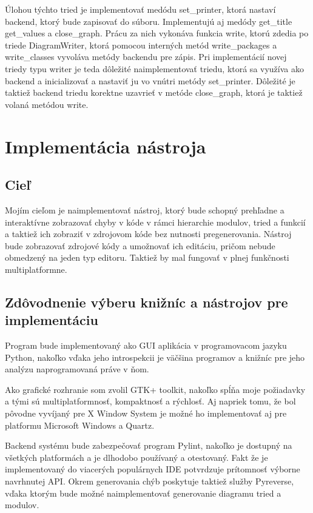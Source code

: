 \documentclass[11pt,oneside,final]{fithesis2}
\begin{document}
    	Úlohou týchto tried je implementovať medódu set\_printer, ktorá nastaví backend, ktorý bude zapisovať do súboru.
    	Implementujú aj medódy get\_title get\_values a close\_graph.
    	Prácu za nich vykonáva funkcia write, ktorú zdedia po triede DiagramWriter, ktorá pomocou interných metód write\_packages a write\_classes vyvoláva metódy backendu pre zápis. Pri implementácií novej triedy typu writer je teda dôležité naimplementovať triedu, ktorá sa využíva ako backend a inicializovať a nastaviť ju vo vnútri metódy set\_printer.
    	Dôležité je taktiež backend triedu korektne uzavrieť v metóde close\_graph, ktorá je taktiež volaná metódou write.
 
\chapter{Implementácia nástroja}
	\section{Cieľ}
	
	Mojím cieľom je naimplementovať nástroj, ktorý bude schopný prehľadne a interaktívne zobrazovať chyby v kóde v rámci hierarchie modulov, tried a funkcií a taktiež ich zobraziť v zdrojovom kóde bez nutnosti pregenerovania. Nástroj bude zobrazovať zdrojové kódy a umožnovať ich editáciu, pričom nebude obmedzený na jeden typ editoru. Taktiež by mal fungovať v plnej funkčnosti multiplatformne.
	
	\section{Zdôvodnenie výberu knižníc a nástrojov pre implementáciu}
		Program bude implementovaný ako GUI aplikácia v programovacom jazyku Python, nakoľko vďaka jeho introspekcii je väčšina programov a knižníc pre jeho analýzu naprogramovaná práve v ňom.
		
		Ako grafické rozhranie som zvolil GTK+ toolkit, nakoľko spĺňa moje požiadavky a tými sú multiplatformnosť, kompaktnosť a rýchlosť. Aj napriek tomu, že bol pôvodne vyvíjaný pre X Window System je možné ho implementovať aj pre platformu Microsoft Windows a Quartz.
		
		Backend systému bude zabezpečovať program Pylint, nakoľko je dostupný na všetkých platformách a je dlhodobo používaný a otestovaný. Fakt že je implementovaný do viacerých populárnych IDE potvrdzuje prítomnosť výborne navrhnutej API. Okrem generovania chýb poskytuje taktiež služby Pyreverse, vďaka ktorým bude možné naimplementovať generovanie diagramu tried a modulov.
		
\end{document}
